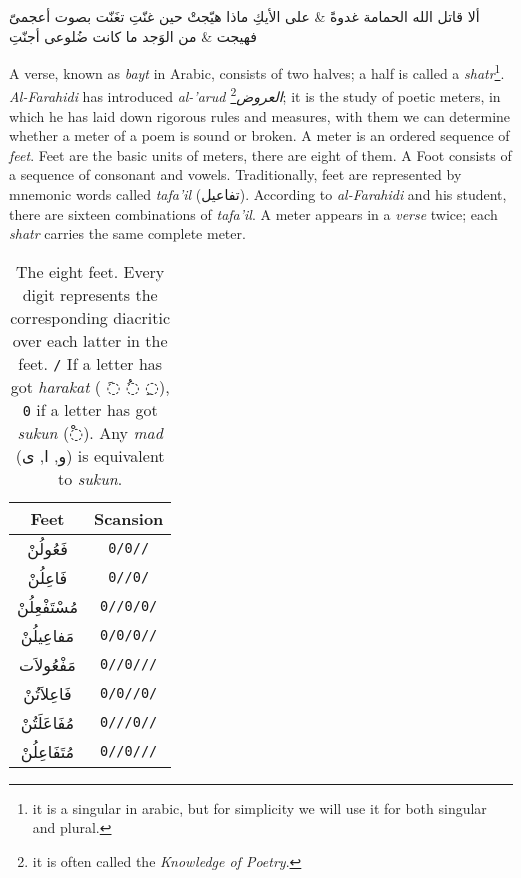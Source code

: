 \documentclass[12pt]{report}
\begin{document}
\begin{Arabic}
  \begin{traditionalpoem*}

    ألا قاتل الله الحمامة غدوةً \quad & \quad على الأيكِ ماذا هيّجتْ حين غنّتِ
    تغَنّت بصوت أعجمىّ فهيجت  \quad & \quad من الوَجد ما كانت ضُلوعى أجنّتِ
  \end{traditionalpoem*}
\end{Arabic}%

A verse, known as \textit{bayt} in Arabic, consists of two halves; a half is
called a \textit{shatr}\footnote{it is a singular in arabic, but for simplicity
we will use it for both singular and plural.}. %
\textit{Al-Farahidi} has introduced \textit{al-'arud
\textarabic{العروض}}\footnote{it is often called the \textit{Knowledge of
Poetry}.}; it is the study of poetic meters, in which he has laid down rigorous
rules and measures, with them we can determine whether a meter of a poem is sound
or broken. A meter is an ordered sequence of \textit{feet}. Feet are the basic
units of meters, there are eight of them. A Foot consists of a sequence of
consonant and vowels. Traditionally, feet are represented by mnemonic words
called \textit{tafa'il} (\textarabic{تفاعيل}).  According to \textit{al-Farahidi}
and his student, there are sixteen combinations of \textit{tafa'il}. A meter
appears in a \textit{verse} twice; each \textit{shatr} carries the same complete
meter.%

\begin{table}[!t]
  \centering
  \begin{tabular}{|c|c|} 
    \hline
    \textbf{Feet} & \textbf{Scansion} \\ 
    \hline
    \textarabic{فَعُولُنْ}  & \texttt{0/0//}\\
    \textarabic{فَاعِلُنْ}  & \texttt{0//0/}\\
    \textarabic{مُسْتَفْعِلُنْ}& \texttt{0//0/0/}\\
    \textarabic{مَفاعِيلُنْ}& \texttt{0/0/0//}\\
    \textarabic{مَفْعُولاَت} & \texttt{0//0///}\\
    \textarabic{فَاعِلاَتُنْ} & \texttt{0/0//0/}\\
    \textarabic{مُفَاعَلَتُنْ}& \texttt{0///0//}\\
    \textarabic{مُتَفَاعِلُنْ}& \texttt{0//0///}\\
    \hline
  \end{tabular}
  \caption{The eight feet. Every digit represents the corresponding diacritic
over each latter in the feet. \texttt{/} If a letter has got \textit{harakat} (
\textarabic{◌َ} \textarabic{◌ُ} \textarabic{◌ِ}), \texttt{0} if a letter has got
\textit{sukun} (\textarabic{◌ْ}). Any \textit{mad} (\textarabic{و, ا, ى}) is
equivalent to \textit{sukun}.}\label{arud:feet}
\end{table}
\end{document}
